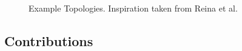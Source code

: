 \begin{figure}%
    \centering
    \qquad
    \caption{Example Topologies. Inspiration taken from Reina et al.~\cite{reina2013role}}%
    \label{fig:topologies}%
\end{figure}

\FloatBarrier




\subsection{Contributions}
\label{sec:contributions}

